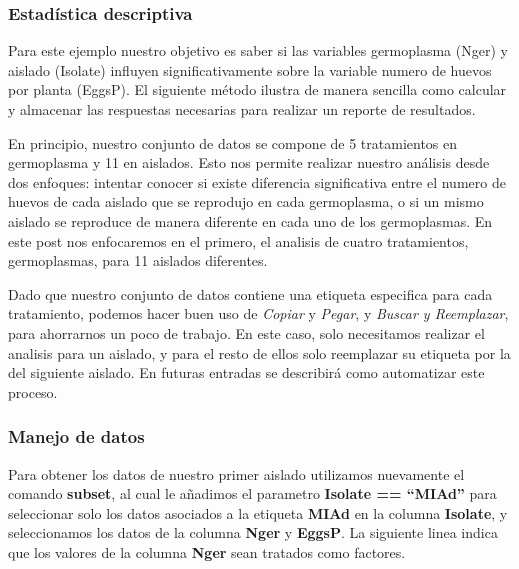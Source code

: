 \documentclass[]{article}
\newenvironment{Shaded}{\begin{snugshade}}{\end{snugshade}}
\newcommand{\CommentTok}[1]{\textcolor[rgb]{0.56,0.35,0.01}{\textit{#1}}}
\newcommand{\DataTypeTok}[1]{\textcolor[rgb]{0.13,0.29,0.53}{#1}}
\newcommand{\KeywordTok}[1]{\textcolor[rgb]{0.13,0.29,0.53}{\textbf{#1}}}
\newcommand{\NormalTok}[1]{#1}
\newcommand{\OperatorTok}[1]{\textcolor[rgb]{0.81,0.36,0.00}{\textbf{#1}}}
\newcommand{\StringTok}[1]{\textcolor[rgb]{0.31,0.60,0.02}{#1}}
\begin{document}
\hypertarget{estadistica-descriptiva}{%
\subsubsection{Estadística descriptiva}\label{estadistica-descriptiva}}

Para este ejemplo nuestro objetivo es saber si las variables germoplasma
(Nger) y aislado (Isolate) influyen significativamente sobre la variable
numero de huevos por planta (EggsP). El siguiente método ilustra de
manera sencilla como calcular y almacenar las respuestas necesarias para
realizar un reporte de resultados.

En principio, nuestro conjunto de datos se compone de 5 tratamientos en
germoplasma y 11 en aislados. Esto nos permite realizar nuestro análisis
desde dos enfoques: intentar conocer si existe diferencia significativa
entre el numero de huevos de cada aislado que se reprodujo en cada
germoplasma, o si un mismo aislado se reproduce de manera diferente en
cada uno de los germoplasmas. En este post nos enfocaremos en el
primero, el analisis de cuatro tratamientos, germoplasmas, para 11
aislados diferentes.

Dado que nuestro conjunto de datos contiene una etiqueta especifica para
cada tratamiento, podemos hacer buen uso de \emph{Copiar} y
\emph{Pegar}, y \emph{Buscar y Reemplazar}, para ahorrarnos un poco de
trabajo. En este caso, solo necesitamos realizar el analisis para un
aislado, y para el resto de ellos solo reemplazar su etiqueta por la del
siguiente aislado. En futuras entradas se describirá como automatizar
este proceso.

\hypertarget{manejo-de-datos-1}{%
\subsubsection{Manejo de datos}\label{manejo-de-datos-1}}

Para obtener los datos de nuestro primer aislado utilizamos nuevamente
el comando \textbf{subset}, al cual le añadimos el parametro
\textbf{Isolate == ``MIAd''} para seleccionar solo los datos asociados a
la etiqueta \textbf{MIAd} en la columna \textbf{Isolate}, y
seleccionamos los datos de la columna \textbf{Nger} y \textbf{EggsP}. La
siguiente linea indica que los valores de la columna \textbf{Nger} sean
tratados como factores.

\begin{Shaded}
\end{Shaded}
\end{document}
